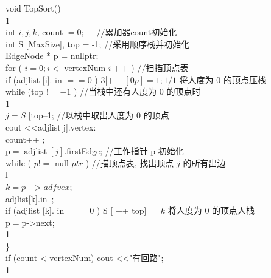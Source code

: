 \documentclass[10pt]{article}
\begin{document}
void TopSort()\\
1\\
int $i, j, k$, count $=0 ; \quad$ //累加器count初始化\\[0pt]
int S [MaxSize], top = -1; //采用顺序栈并初始化\\
EdgeNode * p = nullptr;\\
for ( $i=0 ; i<$ vertexNum $i++$ ) //扫描顶点表\\[0pt]
if (adjlist [i]. in $==0$ ) $3[++[0 p]=1 ; 1 / 1$ 将人度为 0 的顶点压栈\\
while (top $!=-1$ ) //当栈中还有人度为 0 的顶点时\\
1\\
$j=S$ [top--1; //以栈中取出人度为 0 的顶点\\[0pt]
cout <<adjlist[j].vertex:\\
count++ ;\\
$\mathrm{p}=\operatorname{adjlist}[j]$.firstEdge; //工作指针 p 初始化\\
while ( $p!=$ null $p t r$ ) //描顶点表, 找出顶点 $j$ 的所有出边\\
l\\
$k=p->a d f v e x ;$\\[0pt]
adjlist[k].in--;\\[0pt]
if (adjlist [k]. in $==0$ ) S [ ++ top] $=k$ 将人度为 0 的顶点人栈\\
$\mathrm{p}=\mathrm{p}$->next;\\
1\\
\}\\
if (count < vertexNum) cout <<"有回路";\\
1
\end{document}
